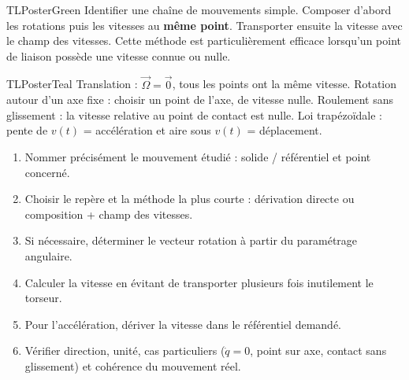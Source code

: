 \documentclass[10pt,a3paper]{article}
\begin{document}
\begin{minipage}[t]{0.49\linewidth}
\begin{TLPosterBloc}{TLPosterGreen}
Identifier une chaîne de mouvements simple. Composer d'abord les rotations puis les vitesses au \textbf{même point}. Transporter ensuite la vitesse avec le champ des vitesses. Cette méthode est particulièrement efficace lorsqu'un point de liaison possède une vitesse connue ou nulle.
\end{TLPosterBloc}
\begin{TLPosterBloc}{TLPosterTeal}
Translation : $\vec\Omega=\vec0$, tous les points ont la même vitesse. Rotation autour d'un axe fixe : choisir un point de l'axe, de vitesse nulle. Roulement sans glissement : la vitesse relative au point de contact est nulle. Loi trapézoïdale : pente de $v(t)$ = accélération et aire sous $v(t)$ = déplacement.
\end{TLPosterBloc}
\end{minipage}
\vfill
\begin{TLPosterMethode}
\begin{enumerate}
  \item Nommer précisément le mouvement étudié : solide / référentiel et point concerné.
  \item Choisir le repère et la méthode la plus courte : dérivation directe ou composition + champ des vitesses.
  \item Si nécessaire, déterminer le vecteur rotation à partir du paramétrage angulaire.
  \item Calculer la vitesse en évitant de transporter plusieurs fois inutilement le torseur.
  \item Pour l'accélération, dériver la vitesse dans le référentiel demandé.
  \item Vérifier direction, unité, cas particuliers ($\dot q=0$, point sur axe, contact sans glissement) et cohérence du mouvement réel.
\end{enumerate}
\end{TLPosterMethode}
\vfill
{}
\end{document}
